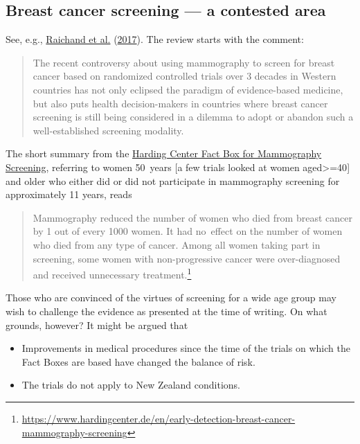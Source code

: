 \documentclass[
  10pt,
  b5paper]{book}
\providecommand{\tightlist}{%
  \setlength{\itemsep}{0pt}\setlength{\parskip}{0pt}}
\begin{document}
\hypertarget{breast-cancer-screening-a-contested-area}{%
\subsection*{Breast cancer screening --- a contested area}\label{breast-cancer-screening-a-contested-area}}

See, e.g., \protect\hyperlink{ref-raichand2017conclusions}{Raichand et al.} (\protect\hyperlink{ref-raichand2017conclusions}{2017}). The review starts with the comment:

\begin{quote}
The recent controversy about using mammography to screen for breast cancer
based on randomized controlled trials over 3 decades in Western countries has
not only eclipsed the paradigm of evidence-based medicine, but also puts health decision-makers in countries where breast cancer screening is still being considered in a dilemma to adopt or abandon such a well-established screening modality.
\end{quote}

The short summary from the
\href{https://www.hardingcenter.de/en/early-detection-breast-cancer-mammography-screening}{Harding Center Fact Box for Mammography Screening}, referring to women 50~years {[}a few trials looked at
women aged\textgreater=40{]} and older who either did or did not participate in
mammography screening for approximately 11 years, reads

\begin{quote}
Mammography reduced the number of women who died from breast
cancer by 1 out of every 1000 women. It had no~effect on the
number of women who died from any type of cancer. Among all
women taking part in screening, some women with non-progressive
cancer were over-diagnosed and received unnecessary treatment.\footnote{\url{https://www.hardingcenter.de/en/early-detection-breast-cancer-mammography-screening}}
\end{quote}

Those who are convinced of
the virtues of screening for a wide age group may wish to challenge
the evidence as presented at the time of writing. On what grounds,
however? It might be argued that

\begin{itemize}
\tightlist
\item
  Improvements in medical procedures since the time of the trials
  on which the Fact Boxes are based have changed the balance of risk.
\item
  The trials do not apply to New Zealand conditions.
\end{itemize}
\end{document}
